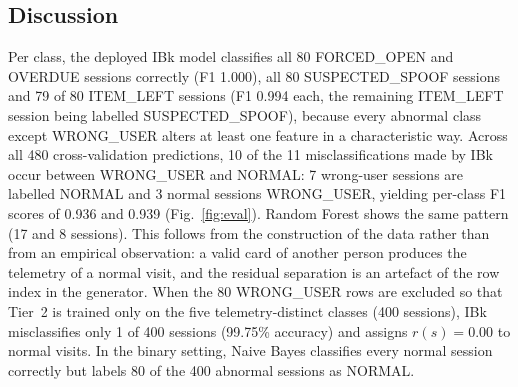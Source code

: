 \documentclass[journal,onecolumn]{IEEEtran}
\begin{document}
\subsection{Discussion}

Per class, the deployed IBk model classifies all 80 FORCED\_OPEN and OVERDUE sessions correctly (F1 1.000), all 80
SUSPECTED\_SPOOF sessions and 79 of 80 ITEM\_LEFT sessions (F1 0.994 each, the remaining ITEM\_LEFT session being
labelled SUSPECTED\_SPOOF), because every abnormal class except WRONG\_USER alters at least one feature in a
characteristic way. Across all 480 cross-validation predictions, 10 of the 11 misclassifications made by IBk occur
between WRONG\_USER and NORMAL: 7 wrong-user sessions are labelled NORMAL and 3 normal sessions WRONG\_USER, yielding
per-class F1 scores of 0.936 and 0.939 (Fig.~\ref{fig:eval}). Random Forest shows the same pattern (17 and 8 sessions).
This follows from the construction of the data rather than from an empirical observation: a valid card of another person
produces the telemetry of a normal visit, and the residual separation is an artefact of the row index in the generator.
When the 80 WRONG\_USER rows are excluded so that Tier~2 is trained only on the five telemetry-distinct classes
(400 sessions), IBk misclassifies only 1 of 400 sessions (99.75\% accuracy) and assigns $r(s) = 0.00$ to normal visits.
In the binary setting, Naive Bayes classifies every normal session correctly but labels 80 of the 400 abnormal sessions
as NORMAL.
\end{document}

